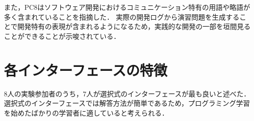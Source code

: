 

また，PC8はソフトウェア開発におけるコミュニケーション特有の用語や略語が多く含まれていることを指摘した．
実際の開発ログから演習問題を生成することで開発特有の表現が含まれるようになるため，実践的な開発の一部を垣間見ることができることが示唆されている．












\section{各インターフェースの特徴}

8人の実験参加者のうち，7人が選択式のインターフェースが最も良いと述べた．
選択式のインターフェースでは解答方法が簡単であるため，プログラミング学習を始めたばかりの学習者に適していると考えられる．




